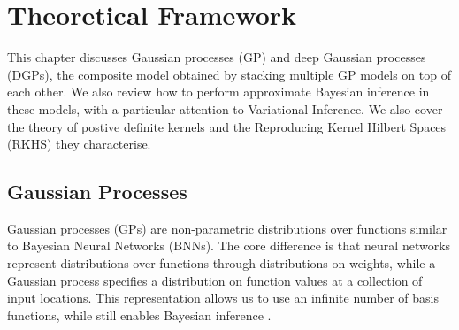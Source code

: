 \ifpdf
    \graphicspath{{Chapter2/Figs/Raster/}{Chapter2/Figs/PDF/}{Chapter2/Figs/}}
\else
    \graphicspath{{Chapter2/Figs/Vector/}{Chapter2/Figs/}}
\fi



\chapter{Theoretical Framework}
\label{chapter:theoretical-framework}

This chapter discusses Gaussian processes (GP) and deep Gaussian processes (DGPs), the composite model obtained by stacking multiple GP models on top of each other. We also review how to perform approximate Bayesian inference in these models, with a particular attention to Variational Inference. We also cover the theory of postive definite kernels and the Reproducing Kernel Hilbert Spaces (RKHS) they characterise.

\section{Gaussian Processes}
\label{sec:chapter1:gp}


Gaussian processes (GPs) \citep{rasmussen2006} are non-parametric distributions over functions similar to Bayesian Neural Networks (BNNs). The core difference is that neural networks represent distributions over functions through distributions on weights, while a Gaussian process specifies a distribution on function values at a collection of input locations. This representation allows us to use an infinite number of basis functions, while still enables Bayesian inference \citep{neal1996bayesian}. 

